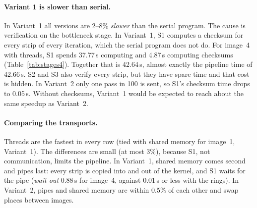 \documentclass[11pt,a4paper]{article}
\newcommand{\cfgPasses}{100}
\begin{document}
\paragraph{Variant 1 is slower than serial.} In Variant~1 all versions are 2--8\% \emph{slower}
than the serial program. The cause is verification on the bottleneck stage. In Variant~1, S1
computes a checksum for every strip of every iteration, which the serial program does not do.
For image~4 with threads, S1 spends 37.77\,s computing and 4.87\,s computing checksums
(Table~\ref{tab:stages4}). Together that is 42.64\,s, almost exactly the pipeline time of
42.66\,s. S2 and S3 also verify every strip, but they have spare time and that cost is hidden. In
Variant~2 only one pass in \cfgPasses{} is sent, so S1's checksum time drops to 0.05\,s. Without
checksums, Variant~1 would be expected to reach about the same speedup as Variant~2.

\paragraph{Comparing the transports.} Threads are the fastest in every row (tied with shared
memory for image~1, Variant~1). The differences are small (at most 3\%), because S1, not
communication, limits the pipeline. In Variant~1, shared memory comes second and pipes last:
every strip is copied into and out of the kernel, and S1 waits for the pipe (\emph{wait out}
0.88\,s for image~4, against 0.01\,s or less with the rings). In Variant~2, pipes and shared
memory are within 0.5\% of each other and swap places between images.
\end{document}
